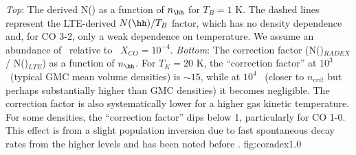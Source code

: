 {{\it Top}: The derived N(\hh) as a function of $n_{\hh}$ for $T_{B}=1$ K.
The dashed lines represent the LTE-derived $N(\hh)/T_B$ factor, which has 
no density dependence and, for CO 3-2, only a weak dependence on temperature.
We assume an abundance of \twelveco\ relative to \hh\ $X_{CO} = 10^{-4}$.
{\it Bottom}: The correction factor (N(\hh)$_{RADEX}$ / N(\hh)$_{LTE}$) as
a function of $n_{\hh}$.
For $T_K=20$ K, the ``correction factor'' at $10^3$ \percc\ (typical GMC
mean volume densities) is $\sim15$, while at $10^4$ \percc\ (closer to $n_{crit}$ but
perhaps substantially higher than GMC densities) it becomes negligible.  The
correction factor is also systematically lower for a higher gas kinetic
temperature.
For some densities, the ``correction factor'' dips below 1, particularly for CO
1-0.  This effect is from a slight population inversion due to fast spontaneous
decay rates from the higher levels and has been noted before
\citep[e.g.][]{Goldsmith1972}.
}{fig:coradex}{1.0}

%
